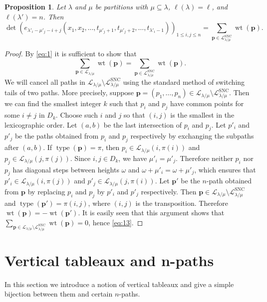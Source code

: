 \documentclass{amsart}
\numberwithin{equation}{section}
\newtheorem{prop}[thm]{Proposition}
\theoremstyle{definition}
\newcommand\type{\operatorname{type}}
\newcommand\LL{\mathcal{L}_\lm}
\newcommand\lsnc{\LL^{\operatorname{SNC}}}
\newcommand\pp{\mathbf{p}}
\newcommand\lm{{\lambda/\mu}}
\newcommand\wt{\operatorname{wt}}
\begin{document}
\begin{prop}\label{prop:snc}
  Let $\lambda$ and $\mu$ be partitions with $\mu\subseteq\lambda$,
  $\ell(\lambda)=\ell$, and $\ell(\lambda')=n$. Then
\[
  \det \left(
    e_{\lambda'_i-\mu'_j-i+j}(x_1,x_2,\dots,t_{\mu'_j+1},t_{\mu'_j+2},\dots,
    t_{\lambda'_i-1}) \right)_{1\le i,j\le n} = \sum_{\pp\in \lsnc} \wt(\pp).
\]
\end{prop}
\begin{proof}
  By \eqref{eq:1} it is sufficient to show that
\begin{equation}
  \label{eq:13}
   \sum_{\pp\in \LL} \wt(\pp) = \sum_{\pp\in \lsnc} \wt(\pp).  
\end{equation}
We will cancel all paths in $\LL\setminus \lsnc$ using the standard method of
switching tails of two paths. More precisely, suppose
$\pp=(p_1,\dots,p_n)\in\LL\setminus \lsnc$. Then we can find the smallest
integer $k$ such that $p_i$ and $p_j$ have common points for some $i\ne j$ in
$D_k$. Choose such $i$ and $j$ so that $(i,j)$ is the smallest in the
lexicographic order. Let $(a,b)$ be the last intersection of $p_i$ and $p_j$.
Let $p'_i$ and $p'_j$ be the paths obtained from $p_i$ and $p_j$ respectively by
exchanging the subpaths after $(a,b)$. If $\type(\pp)=\pi$, then $p_i\in
\LL(i,\pi(i))$ and $p_j\in \LL(j,\pi(j))$. Since $i,j\in D_k$, we have
$\mu'_i=\mu'_j$. Therefore neither $p_i$ nor $p_j$ has diagonal steps between
heights $\omega$ and $\omega+\mu'_i=\omega+\mu'_j$, which ensures that $p'_i\in
\LL(i,\pi(j))$ and $p'_j\in \LL(j,\pi(i))$. Let $\pp'$ be the $n$-path obtained
from $\pp$ by replacing $p_i$ and $p_j$ by $p'_i$ and $p'_j$ respectively. Then
$\pp\in \LL\setminus\lsnc$ and $\type(\pp')=\pi(i,j)$, where $(i,j)$ is the
transposition. Therefore $\wt(\pp)=-\wt(\pp')$. It is easily seen that this
argument shows that $\sum_{\pp\in \LL\setminus\lsnc} \wt(\pp)=0$, hence
\eqref{eq:13}.
\end{proof}




\section{Vertical tableaux and n-paths}
\label{sec:vertical-tableaux}

In this section we introduce a notion of vertical tableaux and give a simple
bijection between them and certain $n$-paths.
\end{document}
